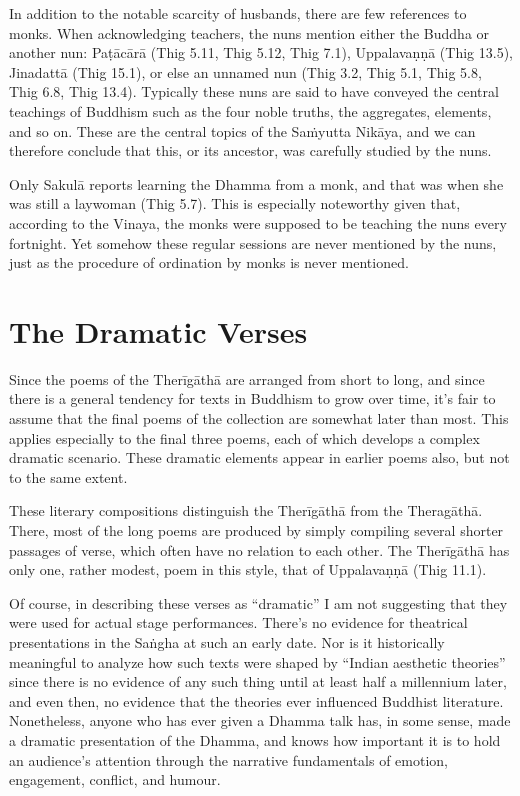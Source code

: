 \documentclass[12pt,openany]{book}%
\begin{document}
In addition to the notable scarcity of husbands, there are few references to monks. When acknowledging teachers, the nuns mention either the Buddha or another nun: \textsanskrit{Paṭācārā} (Thig 5.11, Thig 5.12, Thig 7.1), \textsanskrit{Uppalavaṇṇā} (Thig 13.5), \textsanskrit{Jinadattā} (Thig 15.1), or else an unnamed nun (Thig 3.2, Thig 5.1, Thig 5.8, Thig 6.8, Thig 13.4). Typically these nuns are said to have conveyed the central teachings of Buddhism such as the four noble truths, the aggregates, elements, and so on. These are the central topics of the \textsanskrit{Saṁyutta} \textsanskrit{Nikāya}, and we can therefore conclude that this, or its ancestor, was carefully studied by the nuns.

Only \textsanskrit{Sakulā} reports learning the Dhamma from a monk, and that was when she was still a laywoman (Thig 5.7). This is especially noteworthy given that, according to the Vinaya, the monks were supposed to be teaching the nuns every fortnight. Yet somehow these regular sessions are never mentioned by the nuns, just as the procedure of ordination by monks is never mentioned.

\section*{The Dramatic Verses}

Since the poems of the \textsanskrit{Therīgāthā} are arranged from short to long, and since there is a general tendency for texts in Buddhism to grow over time, it’s fair to assume that the final poems of the collection are somewhat later than most. This applies especially to the final three poems, each of which develops a complex dramatic scenario. These dramatic elements appear in earlier poems also, but not to the same extent.

These literary compositions distinguish the \textsanskrit{Therīgāthā} from the \textsanskrit{Theragāthā}. There, most of the long poems are produced by simply compiling several shorter passages of verse, which often have no relation to each other. The \textsanskrit{Therīgāthā} has only one, rather modest, poem in this style, that of \textsanskrit{Uppalavaṇṇā} (Thig 11.1).

Of course, in describing these verses as “dramatic” I am not suggesting that they were used for actual stage performances. There’s no evidence for theatrical presentations in the \textsanskrit{Saṅgha} at such an early date. Nor is it historically meaningful to analyze how such texts were shaped by “Indian aesthetic theories” since there is no evidence of any such thing until at least half a millennium later, and even then, no evidence that the theories ever influenced Buddhist literature. Nonetheless, anyone who has ever given a Dhamma talk has, in some sense, made a dramatic presentation of the Dhamma, and knows how important it is to hold an audience’s attention through the narrative fundamentals of emotion, engagement, conflict, and humour.
\end{document}

